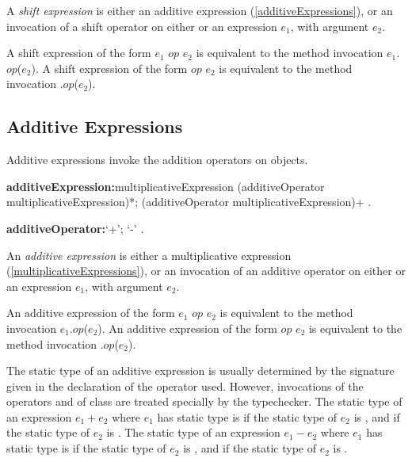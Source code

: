 \documentclass{article}
\newcommand{\code}[1]{{\sf #1}}
\begin{document}
\LMHash{}
A {\em shift expression} is either an additive expression (\ref{additiveExpressions}), or an invocation of a shift operator on either \SUPER{} or an expression $e_1$, with argument $e_2$.

\LMHash{}
 A shift expression of the form  $e_1$ $op$ $e_2$ is equivalent to the method invocation \code{$e_1$.$op$($e_2$)}. A shift expression of the form  \SUPER{} $op$ $e_2$ is equivalent to the method invocation \code{\SUPER{}.$op$($e_2$)}.


 \subsection{ Additive Expressions}

\LMHash{}
Additive expressions invoke the addition operators on objects.

 \begin{grammar}
{\bf additiveExpression:}multiplicativeExpression (additiveOperator multiplicativeExpression)*;
      \SUPER{} (additiveOperator multiplicativeExpression)+
    .

{\bf additiveOperator:}`+';
      `-'
    .
 \end{grammar}

\LMHash{}
An {\em additive expression} is either a multiplicative expression (\ref{multiplicativeExpressions}), or an invocation of an additive operator on either \SUPER{} or an expression $e_1$, with argument $e_2$.

\LMHash{}
An additive expression of the form  $e_1$ $op$ $e_2$ is equivalent to the method invocation \code{$e_1$.$op$($e_2$)}. An additive expression of the form  \SUPER{} $op$ $e_2$ is equivalent to the method invocation \code{\SUPER{}.$op$($e_2$)}.

\LMHash{}
The static type of an additive expression is usually determined by the signature given in the declaration of the operator used. However, invocations of the operators \cd{+}  and \cd{-} of class  are treated specially by the typechecker. The static type of an expression $e_1 + e_2$ where $e_1$ has static type  is  if the static type of $e_2$ is , and  if the static type of $e_2$ is . The static type of an expression $e_1 - e_2$ where $e_1$ has static type  is  if the static type of $e_2$ is , and  if the static type of $e_2$ is .
\end{document}
